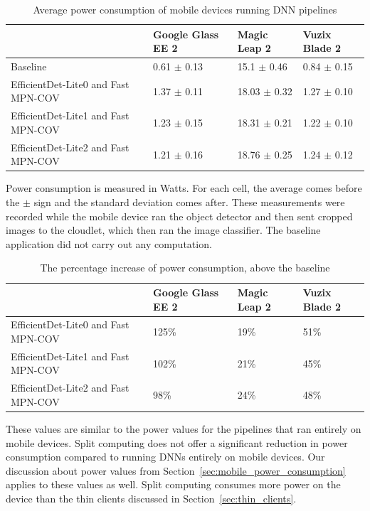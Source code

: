 \begin{table}
\begin{tabular}{|l||l|l|l|}
  \hline
  & Google Glass EE 2 & Magic Leap 2 & Vuzix Blade 2\\
  \hline
  \hline
  Baseline & 0.61 $\pm$ 0.13 & 15.1 $\pm$ 0.46 & 0.84 $\pm$ 0.15\\
  EfficientDet-Lite0 and Fast MPN-COV & 1.37 $\pm$ 0.11 & 18.03 $\pm$ 0.32 & 1.27 $\pm$ 0.10\\
  EfficientDet-Lite1 and Fast MPN-COV & 1.23 $\pm$ 0.15 & 18.31 $\pm$ 0.21 & 1.22 $\pm$ 0.10\\
  EfficientDet-Lite2 and Fast MPN-COV & 1.21 $\pm$ 0.16 & 18.76 $\pm$ 0.25 & 1.24 $\pm$ 0.12\\
  \hline
\end{tabular}
\begin{captiontext}
  Power consumption is measured in Watts.
  For each cell, the average comes before the $\pm$ sign and the standard
    deviation comes after.
    These measurements were recorded while the mobile device ran the object
    detector and then sent cropped images to the cloudlet, which then ran the
    image classifier.
    The baseline application did not carry out any computation.
  \end{captiontext}
  \caption{
    Average power consumption of mobile devices running DNN pipelines
  }\label{tab:split_power}
\end{table}

\begin{table}
\begin{tabular}{|l||l|l|l|}
  \hline
  & Google Glass EE 2 & Magic Leap 2 & Vuzix Blade 2\\
  \hline
  \hline
  EfficientDet-Lite0 and Fast MPN-COV & 125\% & 19\% & 51\%\\
  EfficientDet-Lite1 and Fast MPN-COV & 102\% & 21\% & 45\%\\
  EfficientDet-Lite2 and Fast MPN-COV & 98\% & 24\% & 48\%\\
  \hline
\end{tabular}
  \caption{
    The percentage increase of power consumption, above the baseline
  }\label{tab:split_power_percentage}
\end{table}

These values are similar to the power values for the pipelines that ran entirely
on mobile devices.
Split computing does not offer a significant reduction in power consumption
compared to running DNNs entirely on mobile devices.
Our discussion about power values from
Section~\ref{sec:mobile_power_consumption} applies to these values as well.
Split computing consumes more power on the device than the thin clients
discussed in Section~{\ref{sec:thin_clients}}.

